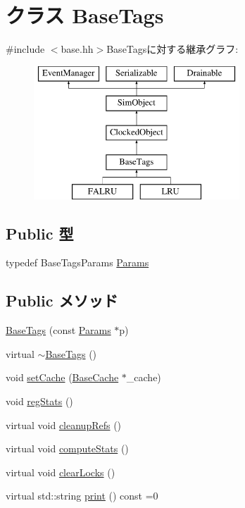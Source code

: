 \hypertarget{classBaseTags}{
\section{クラス BaseTags}
\label{classBaseTags}
}


{\ttfamily \#include $<$base.hh$>$}BaseTagsに対する継承グラフ:\begin{figure}[H]
\begin{center}
\leavevmode
\includegraphics[height=5cm]{classBaseTags}
\end{center}
\end{figure}
\subsection*{Public 型}
\begin{DoxyCompactItemize}
\item 
typedef BaseTagsParams \hyperlink{classBaseTags_aab33a5313a7ca07c69f8a4e6e1490375}{Params}
\end{DoxyCompactItemize}
\subsection*{Public メソッド}
\begin{DoxyCompactItemize}
\item 
\hyperlink{classBaseTags_ae200d65039ec8144c2ec926a52f4fe6f}{BaseTags} (const \hyperlink{classBaseTags_aab33a5313a7ca07c69f8a4e6e1490375}{Params} $\ast$p)
\item 
virtual \hyperlink{classBaseTags_a7d9b66bfc94aa6dbafa003da3e751a8d}{$\sim$BaseTags} ()
\item 
void \hyperlink{classBaseTags_a6a5d34a51c5ba1c4f87dbcc59e8b13fb}{setCache} (\hyperlink{classBaseCache}{BaseCache} $\ast$\_\-cache)
\item 
void \hyperlink{classBaseTags_a4dc637449366fcdfc4e764cdf12d9b11}{regStats} ()
\item 
virtual void \hyperlink{classBaseTags_aab539ffaf653a007b5326b2042dc8e86}{cleanupRefs} ()
\item 
virtual void \hyperlink{classBaseTags_a23fd48fae3a5efe5e8ffbefb54e51c1c}{computeStats} ()
\item 
virtual void \hyperlink{classBaseTags_a9f3e3b80f263780be72db8b9dc53680e}{clearLocks} ()
\item 
virtual std::string \hyperlink{classBaseTags_a56a7c10391fb704ea26efc16f4f4f87b}{print} () const =0
\end{DoxyCompactItemize}
